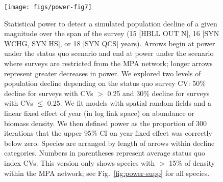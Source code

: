 \documentclass[12pt]{article}
\begin{document}
\clearpage

\begin{figure}[htb]
    \centering
    \texttt{[image: figs/power-fig7]}
    \caption{Statistical power to detect a simulated population decline of a given magnitude over the span of the survey (15 [HBLL OUT N], 16 [SYN WCHG, SYN HS], or 18 [SYN QCS] years). Arrows begin at power under the status quo scenario and end at power under the scenario where surveys are restricted from the MPA network; longer arrows represent greater decreases in power. We explored two levels of population decline depending on the status quo survey CV: 50\% decline for surveys with CVs $>$ 0.25 and 30\% decline for surveys with CVs $\le$ 0.25. We fit models with spatial random fields and a linear fixed effect of year (in log link space) on abundance or biomass density. We then defined power as the proportion of 300 iterations that the upper 95\% CI on year fixed effect was correctly below zero. Species are arranged by length of arrows within decline categories. Numbers in parentheses represent average status quo index CVs. This version only shows species with $>$ 15\% of density within the MPA network; see Fig.~\ref{fig:power-supp} for all species.}
    \label{fig:power}
\end{figure}




\renewcommand{\thefigure}{S\arabic{figure}}
\renewcommand{\thetable}{S\arabic{table}}
\setcounter{figure}{0}
\setcounter{table}{0}
\setcounter{section}{0}
\setcounter{subsection}{0}
\setcounter{subsubsection}{0}

\clearpage

\appendix


\setcounter{secnumdepth}{0} %
\end{document}
